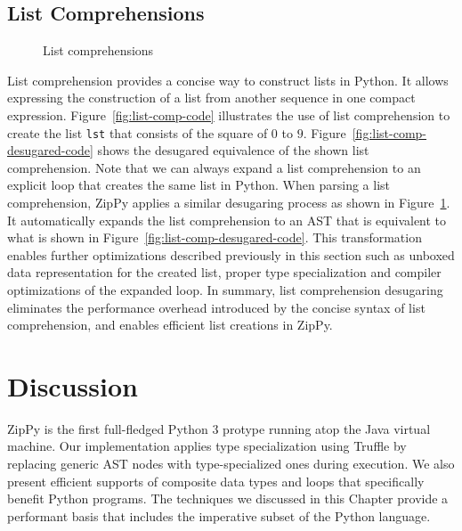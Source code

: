 \subsection{List Comprehensions}

\begin{figure}[h]
\centering
{}
\caption{List comprehensions}
\label{fig:list-comp}
\end{figure}

List comprehension provides a concise way to construct lists in Python.
It allows expressing the construction of a list from another sequence in one compact expression.
Figure~\ref{fig:list-comp-code} illustrates the use of list comprehension to create the list \texttt{lst} that consists of the square of $0$ to $9$.
Figure~\ref{fig:list-comp-desugared-code} shows the desugared equivalence of the shown list comprehension.
Note that we can always expand a list comprehension to an explicit loop that creates the same list in Python.
When parsing a list comprehension, ZipPy applies a similar desugaring process as shown in Figure~\ref{fig:list-comp}.
It automatically expands the list comprehension to an AST that is equivalent to what is shown in Figure~\ref{fig:list-comp-desugared-code}.
This transformation enables further optimizations described previously in this section such as unboxed data representation for the created list, proper type specialization and compiler optimizations of the expanded loop.
In summary, list comprehension desugaring eliminates the performance overhead introduced by the concise syntax of list comprehension, and enables efficient list creations in ZipPy.

\section{Discussion}
ZipPy is the first full-fledged Python 3 protype running atop the Java virtual machine.
Our implementation applies type specialization using Truffle by replacing generic AST nodes with type-specialized ones during execution.
We also present efficient supports of composite data types and loops that specifically benefit Python programs.
The techniques we discussed in this Chapter provide a performant basis that includes the imperative subset of the Python language.
